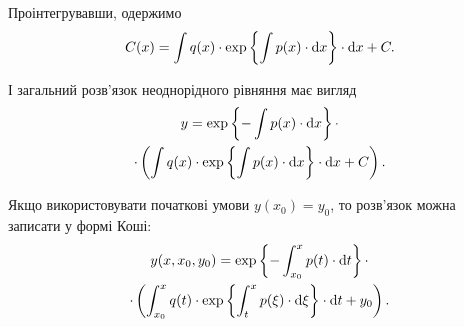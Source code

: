 Проінтегрувавши, одержимо
\begin{equation*} 
	C(x) = \int q(x) \cdot \exp \left\{\int p(x) \cdot \mathop{}\!\mathrm{d} x \right\} \cdot \mathop{}\!\mathrm{d} x + C.
\end{equation*}

І загальний розв’язок неоднорідного рівняння має вигляд
\begin{multline*} 
	y = \exp \left\{ - \int p(x) \cdot \mathop{}\!\mathrm{d} x \right\} \cdot \\
	\cdot \left( \int q(x) \cdot \exp \left\{\int p(x) \cdot \mathop{}\!\mathrm{d} x \right\} \cdot \mathop{}\!\mathrm{d} x + C\right).
\end{multline*}

Якщо використовувати початкові умови $y(x_0) = y_0$, то розв’язок можна записати у формі Коші:
\begin{multline*} 
	y(x, x_0, y_0) = \exp \left\{ - \int_{x_0}^x p(t) \cdot \mathop{}\!\mathrm{d} t \right\} \cdot \\
	\cdot \left( \int_{x_0}^x q(t) \cdot \exp \left\{\int_t^x p(\xi) \cdot \mathop{}\!\mathrm{d} \xi \right\} \cdot \mathop{}\!\mathrm{d} t + y_0\right).
\end{multline*}
